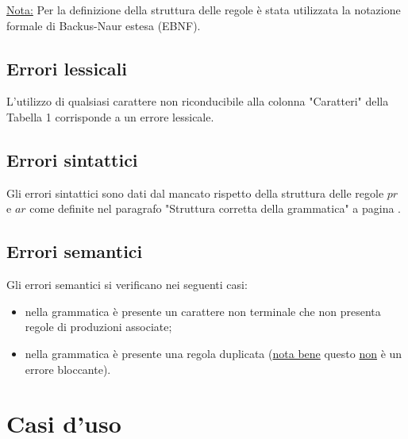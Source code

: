\documentclass[12pt]{article}
\begin{document}
\underline{Nota:} Per la definizione della struttura delle regole è stata utilizzata la notazione formale di Backus-Naur estesa (EBNF).

\subsection{Errori lessicali}
L'utilizzo di qualsiasi carattere non riconducibile alla colonna "Caratteri" della Tabella 1 corrisponde a un errore lessicale.

\subsection{Errori sintattici}
Gli errori sintattici sono dati dal mancato rispetto della struttura delle regole $pr$ e $ar$ come definite nel paragrafo "Struttura corretta della grammatica" a pagina \pageref{struttura}.

\subsection{Errori semantici}
Gli errori semantici si verificano nei seguenti casi:
\begin{itemize}
\item nella grammatica è presente un carattere non terminale che non presenta regole di produzioni associate;
\item nella grammatica è presente una regola duplicata (\underline{nota bene} questo \underline{non} è un errore bloccante).
\end{itemize}
\pagebreak
\section{Casi d'uso}
\end{document}
